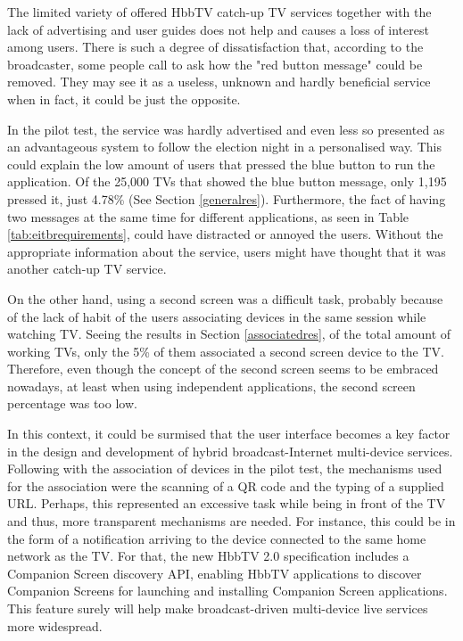 The limited variety of offered HbbTV catch-up TV services together with the lack of advertising and user guides does not help and causes a loss of interest among users. There is such a degree of dissatisfaction that, according to the broadcaster, some people call to ask how the "red button message" could be removed. They may see it as a useless, unknown and hardly beneficial service when in fact, it could be just the opposite.

In the pilot test, the service was hardly advertised and even less so presented as an advantageous system to follow the election night in a personalised way. This could explain the low amount of users that pressed the blue button to run the application. Of the 25,000 TVs that showed the blue button message, only 1,195 pressed it, just 4.78\% (See Section \ref{generalres}). Furthermore, the fact of having two messages at the same time for different applications, as seen in Table \ref{tab:eitbrequirements}, could have distracted or annoyed the users. Without the appropriate information about the service, users might have thought that it was another catch-up TV service.

On the other hand, using a second screen was a difficult task, probably because of the lack of habit of the users associating devices in the same session while watching TV. Seeing the results in Section \ref{associatedres}, of the total amount of working TVs, only the 5\% of them associated a second screen device to the TV. Therefore, even though the concept of the second screen seems to be embraced nowadays, at least when using independent applications, the second screen percentage was too low.  

In this context, it could be surmised that the user interface becomes a key factor in the design and development of hybrid broadcast-Internet multi-device services. Following with the association of devices in the pilot test, the mechanisms used for the association were the scanning of a QR code and the typing of a supplied URL. Perhaps, this represented an excessive task while being in front of the TV and thus, more transparent mechanisms are needed. For instance, this could be in the form of a notification arriving to the device connected to the same home network as the TV. For that, the new HbbTV 2.0 specification includes a Companion Screen discovery API, enabling HbbTV applications to discover Companion Screens for launching and installing Companion Screen applications. This feature surely will help make broadcast-driven multi-device live services more widespread.

